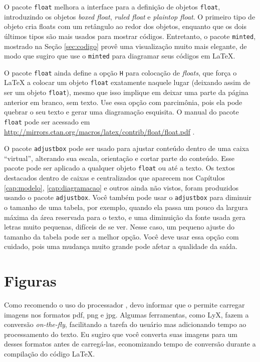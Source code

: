 O pacote \texttt{float} melhora a interface para a definição de objetos \texttt{float}, introduzindo os objetos \textit{boxed float}, \textit{ruled float} e \textit{plaintop float}. O primeiro tipo de objeto cria floats com um retângulo ao redor dos objetos, enquanto que os dois últimos tipos são mais usados para mostrar códigos. Entretanto, o pacote \texttt{minted}, mostrado na Seção \ref{sec:codigo} provê uma visualização muito mais elegante, de modo que sugiro que use o \texttt{minted} para diagramar seus códigos em \LaTeX{}.

O pacote \texttt{float} ainda define a opção \texttt{H} para colocação de \textit{floats}, que força o \LaTeX{} a colocar um objeto \texttt{float} exatamente naquele lugar (deixando assim de ser um objeto \texttt{float}), mesmo que isso implique em deixar uma parte da página anterior em branco, sem texto. Use essa opção com parcimônia, pois ela pode quebrar o seu texto e gerar uma diagramação esquisita. O manual do pacote \texttt{float} pode ser acessado em \url{http://mirrors.ctan.org/macros/latex/contrib/float/float.pdf} \parencite{float}.

O pacote \texttt{adjustbox} pode ser usado para ajustar conteúdo dentro de uma caixa ``virtual'', alterando sua escala, orientação e cortar parte do conteúdo. Esse pacote pode ser aplicado a qualquer objeto \texttt{float} ou até a texto. Os textos destacados dentro de caixas e centralizados que aparecem nos Capítulos \ref{cap:modelo}, \ref{cap:diagramacao}  e outros ainda não vistos, foram produzidos usando o pacote \texttt{adjustbox}. Você também pode usar o \texttt{adjustbox} para diminuir o tamanho de uma tabela, por exemplo, quando ela passa um pouco da largura máxima da área reservada para o texto, e uma diminuição da fonte usada gera letras muito pequenas, difíceis de se ver. Nesse caso, um pequeno ajuste do tamanho da tabela pode ser a melhor opção. Você deve usar essa opção com cuidado, pois uma mudança muito grande pode afetar a qualidade da saída.

\section{Figuras}

Como recomendo o uso do processador , devo informar que o  permite carregar imagens nos formatos \gls{pdf}, \gls{png} e \gls{jpg}. Algumas ferramentas, como LyX, fazem a conversão \textit{on-the-fly}, facilitando a tarefa do usuário mas adicionando tempo ao processamento do texto. Eu sugiro que você converta suas imagens para um desses formatos antes de carregá-las, economizando tempo de conversão durante a compilação do código \LaTeX{}.

